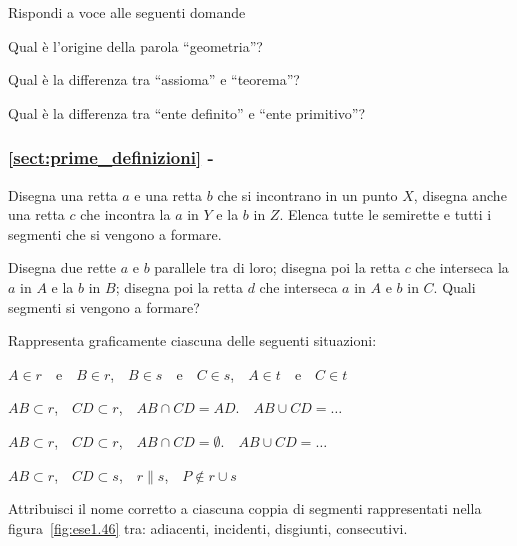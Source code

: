 \begin{esercizio}
\label{ese:1.42}
Rispondi a voce alle seguenti domande
\begin{enumeratea}
\item Qual è l'origine della parola ``geometria''?
\item Qual è la differenza tra ``assioma'' e ``teorema''?
\item Qual è la differenza tra ``ente definito'' e ``ente primitivo''?
\end{enumeratea}
\end{esercizio}

\begingroup
\hypersetup{linkcolor=black}
\subsubsection*{\ref{sect:prime_definizioni} - 
}
\endgroup

\begin{esercizio}
\label{ese:1.43}
Disegna una retta $a$ e una retta $b$ che si incontrano in un punto 
$X$, disegna anche una retta $c$ che incontra la $a$ in $Y$ e la $b$ 
in $Z$. Elenca tutte le semirette e tutti i segmenti che si vengono a 
formare.
\end{esercizio}

\begin{esercizio}
\label{ese:1.44}
Disegna due rette $a$ e $b$ parallele tra di loro; disegna poi la 
retta $c$ che interseca la $a$ in $A$ e la $b$ in $B$; disegna poi la 
retta $d$ che interseca $a$ in $A$ e $b$ in $C$. Quali segmenti si 
vengono a formare?
\end{esercizio}

\begin{esercizio}
\label{ese:1.45}
Rappresenta graficamente ciascuna delle seguenti situazioni:
\begin{enumeratea}
\item $A\in r$~~e~~$B\in r$,~~$B\in s$~~e~~$C\in s$,~~$A\in 
t$~~e~~$C\in t$
\item $AB\subset r$,~~$CD\subset r$,~~$AB\cap CD=AD$.~~$AB\cup 
CD=\ldots{}$
\item $AB\subset r$,~~$CD\subset r$,~~$AB\cap CD=\emptyset$.~~$AB\cup 
CD=\ldots{}$
\item $AB\subset r$,~~$CD\subset s$,~~$r\parallel s$,~~$P\notin r\cup 
s$
\end{enumeratea}
\end{esercizio}

\begin{esercizio}
\label{ese:1.46}
Attribuisci il nome corretto a ciascuna coppia di segmenti 
rappresentati nella figura~\ref{fig:ese1.46} tra: adiacenti, 
incidenti, disgiunti, consecutivi.
\end{esercizio}


